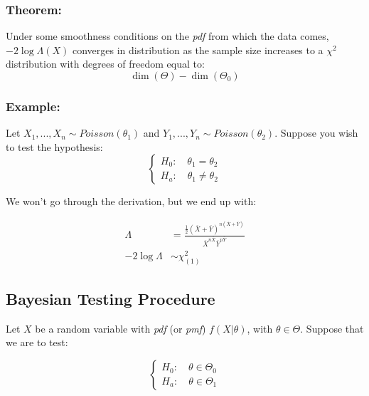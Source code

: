 \documentclass{article}
\begin{document}
    \subsubsection{Theorem:}
    
    Under some smoothness conditions on the \textit{pdf} from which the data comes, $-2\log\Lambda(X)$ converges in distribution as the sample size increases to a $\chi^2$ distribution with degrees of freedom equal to:
    \begin{equation*}
        \dim\left( \Theta\right) - \dim \left(\Theta_0 \right)
    \end{equation*}

    \subsubsection*{Example:}
    
    Let $X_1,...,X_n\sim Poisson(\theta_1)$ and $Y_1,...,Y_n\sim Poisson(\theta_2)$. Suppose you wish to test the hypothesis:
    \begin{equation*}
        \begin{cases}
            H_0: \quad  \theta_1 = \theta_2\\
            H_a: \quad \theta_1 \neq \theta_2
        \end{cases}
    \end{equation*}
    
    We won't go through the derivation, but we end up with:
    
    \begin{equation*}
    \begin{split}
        \Lambda &= \frac{\frac{1}{2} (\overline{X} + \overline{Y})^{n(\overline{X}+\overline{Y})}}{\overline{X}^{n\overline{X}} \overline{Y}^{n\overline{Y}}}\\
        -2\log \Lambda &\sim \chi^2_{(1)}
    \end{split}
    \end{equation*}
    
    \subsection{Bayesian Testing Procedure}
    
    Let $X$ be a random variable with \textit{pdf} (or \textit{pmf}) $f(X|\theta)$, with $\theta \in \Theta$. Suppose that we are to test:
    
    \begin{equation*}
        \begin{cases}
            H_0: \quad \theta \in \Theta_0\\
            H_a: \quad \theta \in \Theta_1
        \end{cases}
    \end{equation*}
    
\end{document}
